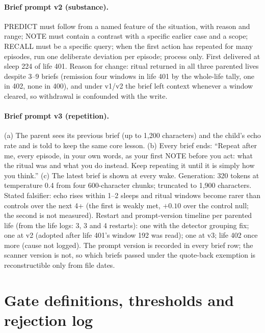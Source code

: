 \documentclass{article}
\begin{document}
\paragraph{Brief prompt v2 (substance).} PREDICT must follow from a named feature of the situation, with reason and range; NOTE must contain a contrast with a specific earlier case and a scope; RECALL must be a specific query; when the first action has repeated for many episodes, run one deliberate deviation per episode; process only. First delivered at sleep 224 of life 401. Reason for change: ritual returned in all three parented lives despite 3--9 briefs (remission four windows in life 401 by the whole-life tally, one in 402, none in 400), and under v1/v2 the brief left context whenever a window cleared, so withdrawal is confounded with the write.

\paragraph{Brief prompt v3 (repetition).} (a) The parent sees its previous brief (up to 1{,}200 characters) and the child's echo rate and is told to keep the same core lesson. (b) Every brief ends: ``Repeat after me, every episode, in your own words, as your first NOTE before you act: what the ritual was and what you do instead. Keep repeating it until it is simply how you think.'' (c) The latest brief is shown at every wake. Generation: 320 tokens at temperature 0.4 from four 600-character chunks; truncated to 1{,}900 characters. Stated falsifier: echo rises within 1--2 sleeps and ritual windows become rarer than controls over the next 4+ (the first is weakly met, $+0.10$ over the control null; the second is not measured). Restart and prompt-version timeline per parented life (from the life logs: 3, 3 and 4 restarts): one with the detector grouping fix; one at v2 (adopted after life 401's window 192 was read); one at v3; life 402 once more (cause not logged). The prompt version is recorded in every brief row; the scanner version is not, so which briefs passed under the quote-back exemption is reconstructible only from file dates.

\section{Gate definitions, thresholds and rejection log}
\label{app:gates}
\end{document}
